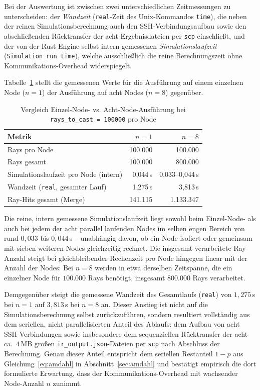 \documentclass{article}
\begin{document}
Bei der Auswertung ist zwischen zwei unterschiedlichen Zeitmessungen zu
unterscheiden: der \emph{Wandzeit} (\texttt{real}-Zeit des
Unix-Kommandos \texttt{time}), die neben der reinen
Simulationsberechnung auch den SSH-Verbindungsaufbau sowie den
abschließenden Rücktransfer der acht Ergebnisdateien per \texttt{scp}
einschließt, und der von der Rust-Engine selbst intern gemessenen
\emph{Simulationslaufzeit} (\texttt{Simulation run time}), welche
ausschließlich die reine Berechnungszeit ohne Kommunikations-Overhead
widerspiegelt.

Tabelle~\ref{tab:finaler-testlauf} stellt die gemessenen Werte für die
Ausführung auf einem einzelnen Node ($n=1$) der Ausführung auf acht
Nodes ($n=8$) gegenüber.

\begin{table}[htbp]
 \centering
 \caption{Vergleich Einzel-Node- vs. Acht-Node-Ausführung bei
 \texttt{rays\_to\_cast = 100000} pro Node}
 
 \label{tab:finaler-testlauf}
 \begin{tabular}{lrr}
 \toprule
 Metrik & $n=1$ & $n=8$ \\
 \midrule
 Rays pro Node & 100.000 & 100.000 \\
 Rays gesamt & 100.000 & 800.000 \\
 Simulationslaufzeit pro Node (intern) & 0{,}044\,s & 0{,}033--0{,}044\,s \\
 Wandzeit (\texttt{real}, gesamter Lauf) & 1{,}275\,s & 3{,}813\,s \\
 Ray-Hits gesamt (Merge) & 141.115 & 1.133.347 \\
 \bottomrule
 \end{tabular}
\end{table}

Die reine, intern gemessene Simulationslaufzeit liegt sowohl beim
Einzel-Node- als auch bei jedem der acht parallel laufenden Nodes im
selben engen Bereich von rund $0{,}033$ bis $0{,}044\,$s -- unabhängig
davon, ob ein Node isoliert oder gemeinsam mit sieben weiteren Nodes
gleichzeitig rechnet. Die insgesamt verarbeitete Ray-Anzahl steigt bei
gleichbleibender Rechenzeit pro Node hingegen linear mit der Anzahl der
Nodes: Bei $n=8$ werden in etwa derselben Zeitspanne, die ein einzelner
Node für $100.000$ Rays benötigt, insgesamt $800.000$ Rays verarbeitet.

Demgegenüber steigt die gemessene Wandzeit des Gesamtlaufs
(\texttt{real}) von $1{,}275\,$s bei $n=1$ auf $3{,}813\,$s bei $n=8$ an.
Dieser Anstieg ist nicht auf die Simulationsberechnung selbst
zurückzuführen, sondern resultiert vollständig aus dem seriellen, nicht
parallelisierten Anteil des Ablaufs: dem Aufbau von acht
SSH-Verbindungen sowie insbesondere dem sequenziellen Rücktransfer der
acht ca.\ $4\,$MB großen \texttt{ir\_output.json}-Dateien per
\texttt{scp} nach Abschluss der Berechnung. Genau dieser Anteil
entspricht dem seriellen Restanteil $1-p$ aus
Gleichung~\eqref{eq:amdahl} in Abschnitt~\ref{sec:amdahl} und bestätigt
empirisch die dort formulierte Erwartung, dass der
Kommunikations-Overhead mit wachsender Node-Anzahl $n$ zunimmt.
\end{document}
